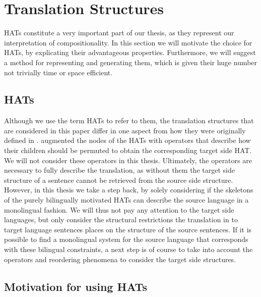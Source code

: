 \section{Translation Structures}
\label{sec:comp_structures2}

HATs constitute a very important part of our thesis, as they represent our interpretation of compositionality. In this section we will motivate the choice for HATs, by explicating their advantageous properties. Furthermore, we will suggest a method for representing and generating them, which is given their huge number not trivially time or space efficient.

\subsection{HATs}

Although we use the term HATs to refer to them, the translation structures that are considered in this paper differ in one aspect from how they were originally defined in \citep{simaan2013hats}. \citeauthor{simaan2013hats} augmented the nodes of the HATs with operators that describe how their children should be permuted to obtain the corresponding target side HAT. We will not consider these operators in this thesis. Ultimately, the operators are necessary to fully describe the translation, as without them the target side structure of a sentence cannot be retrieved from the source side structure. However, in this thesis we take a step back, by solely considering if the skeletons of the purely bilingually motivated HATs can describe the source language in a monolingual fashion. We will thus not pay any attention to the target side languages, but only consider the structural restrictions the translation in to target language sentences places on the structure of the source sentences. If it is possible to find a monolingual system for the source language that corresponds with these bilingual constraints, a next step is of course to take into account the operators and reordering phenomena to consider the target side structures.

\subsection{Motivation for using HATs}

